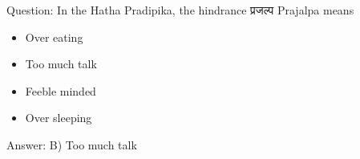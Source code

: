 %
%
%

\begin{frame}[fragile]\frametitle{}

Question: In the Hatha Pradipika, the hindrance प्रजल्प Prajalpa means

\begin{itemize}
\item[A)] Over eating
\item[B)] Too much talk
\item[C)] Feeble minded
\item[D)] Over sleeping
\end{itemize}

Answer: B) Too much talk
\end{frame}

%
%
%

